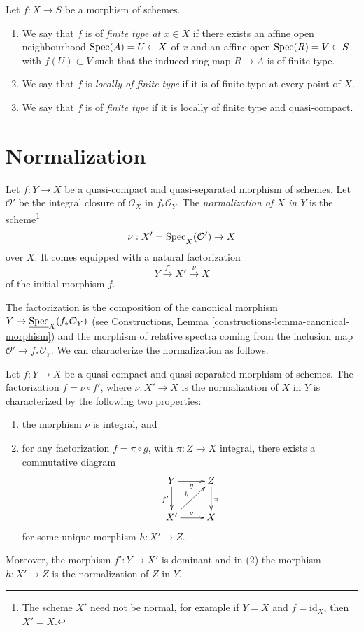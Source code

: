 \begin{definition}
\label{definition-finite-type}
Let $f : X \to S$ be a morphism of schemes.
\begin{enumerate}
\item We say that $f$ is of {\it finite type at $x \in X$} if
there exists an affine open neighbourhood $\mathop{\mathrm{Spec}}(A) = U \subset X$
of $x$ and an affine open $\mathop{\mathrm{Spec}}(R) = V \subset S$
with $f(U) \subset V$ such that the induced ring map
$R \to A$ is of finite type.
\item We say that $f$ is {\it locally of finite type} if it is
of finite type at every point of $X$.
\item We say that $f$ is of {\it finite type} if it is locally of
finite type and quasi-compact.
\end{enumerate}
\end{definition}

\section{Normalization}
\label{section-normalization}

\begin{definition}
\label{definition-normalization-X-in-Y}
Let $f : Y \to X$ be a quasi-compact and quasi-separated morphism of schemes.
Let $\mathcal{O}'$ be the integral closure of $\mathcal{O}_X$ in
$f_*\mathcal{O}_Y$. The {\it normalization of $X$ in $Y$} is the
scheme\footnote{The scheme $X'$ need not be normal, for example if
$Y = X$ and $f = \text{id}_X$, then $X' = X$.}
$$
\nu : X' = \underline{\mathop{\mathrm{Spec}}}_X(\mathcal{O}') \to X
$$
over $X$. It comes equipped with a natural factorization
$$
Y \xrightarrow{f'} X' \xrightarrow{\nu} X
$$
of the initial morphism $f$.
\end{definition}

\noindent
The factorization is the composition of the canonical morphism
$Y \to \underline{\mathop{\mathrm{Spec}}}_X(f_*\mathcal{O}_Y)$ (see
Constructions, Lemma
\ref{constructions-lemma-canonical-morphism})
and the morphism of relative spectra coming from the inclusion map
$\mathcal{O}' \to f_*\mathcal{O}_Y$. We can characterize the
normalization as follows.

\begin{lemma}
\label{lemma-characterize-normalization}
Let $f : Y \to X$ be a quasi-compact and quasi-separated morphism of schemes.
The factorization $f = \nu \circ f'$, where $\nu : X' \to X$ is the
normalization of $X$ in $Y$ is characterized by the following
two properties:
\begin{enumerate}
\item the morphism $\nu$ is integral, and
\item for any factorization $f = \pi \circ g$, with $\pi : Z \to X$
integral, there exists a commutative diagram
$$
\xymatrix{
Y \ar[d]_{f'} \ar[r]_g & Z \ar[d]^\pi \\
X' \ar[ru]^h \ar[r]^\nu & X
}
$$
for some unique morphism $h : X' \to Z$.
\end{enumerate}
Moreover, the morphism $f' : Y \to X'$ is dominant and in (2) the
morphism $h : X' \to Z$ is the normalization of $Z$ in $Y$.
\end{lemma}



